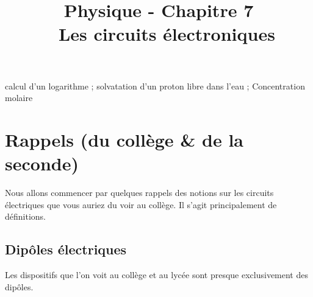 \documentclass[11pt,a4paper]{article}
\title{\large Physique - Chapitre 7 \\ \LARGE  Les circuits électroniques}
\date{}
\author{}
\begin{document}
\maketitle
\vspace{-1cm}
\begin{tcolorbox}[title=Notions de la classe de première à rappeler]
calcul d'un logarithme ; solvatation d'un proton libre dans l'eau ; Concentration molaire
\end{tcolorbox}
\tableofcontents

\section{Rappels (du collège \& de la seconde)}
Nous allons commencer par quelques rappels des notions sur les circuits électriques que vous auriez du voir au collège. Il s'agit principalement de  définitions.

\subsection{Dipôles électriques}

Les dispositifs que l'on voit au collège et au lycée sont presque exclusivement des dipôles. 
\end{document}
